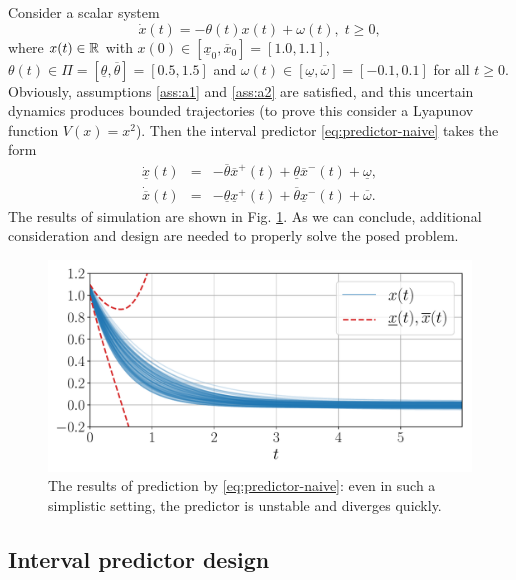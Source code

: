 \begin{example*}
	[motivating] Consider a scalar system
	\[
	\dot{x}(t)=-\theta(t)x(t)+\omega(t),\;t\geq0,
	\]
	where $x(t)\in\mathbb{R}$ with $x(0)\in[\underline{x}_{0},\overline{x}_{0}]=[1.0, 1.1]$, $\theta(t)\in\Pi=[\underline{\theta},\overline{\theta}]=[0.5,1.5]$ and $\omega(t)\in[\underline{\omega},\overline{\omega}]=[-0.1,0.1]$ for all $t\geq0$. Obviously, assumptions \ref{ass:a1} and \ref{ass:a2} are satisfied, and this uncertain dynamics produces bounded trajectories (to prove this consider a Lyapunov function $V(x)=x^{2}$). Then the interval predictor \eqref{eq:predictor-naive} takes the form
	\begin{eqnarray*}
		\dot{\underline{x}}(t) & = & -\overline{\theta}\overline{x}^{+}(t)+\underline{\theta}\overline{x}^{-}(t)+\underline{\omega},\\
		\dot{\overline{x}}(t) & = & -\underline{\theta}\underline{x}^{+}(t)+\overline{\theta}\underline{x}^{-}(t)+\overline{\omega}.
	\end{eqnarray*}
	The results of simulation are shown in Fig. \ref{fig:IP_Direct}. As we can conclude, additional consideration and design are needed to properly solve the posed problem.
	\begin{figure}
		\begin{centering}
			\includegraphics[width=0.8\linewidth]{img/observer}
			\par\end{centering}
		\caption{\label{fig:IP_Direct} The results of prediction by \eqref{eq:predictor-naive}: even in such a simplistic setting, the predictor is unstable and diverges quickly.}
	\end{figure}
\end{example*}

\subsection{Interval predictor design}
\label{sec:Main-results}


